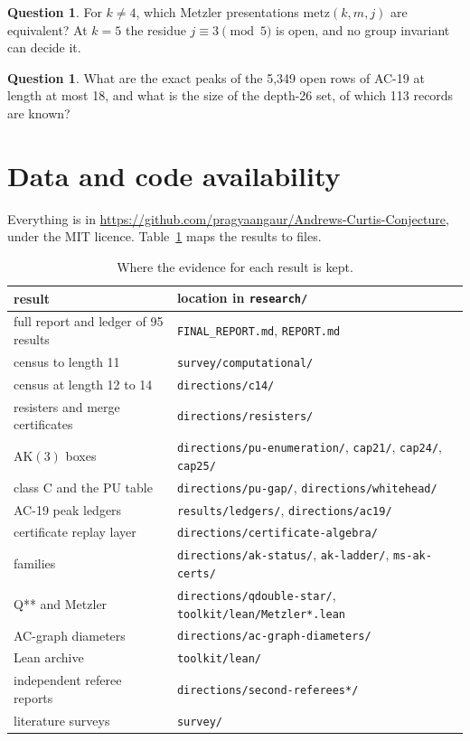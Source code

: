 \documentclass[11pt,a4paper]{article}
\theoremstyle{definition}
\newtheorem{question}[theorem]{Question}
\newcommand{\AK}{\mathrm{AK}}
\newcommand{\repo}{\url{https://github.com/pragyaangaur/Andrews-Curtis-Conjecture}}
\begin{document}
\begin{question}
For $k\ne4$, which Metzler presentations $\mathrm{metz}(k,m,j)$ are equivalent? At $k=5$ the residue $j\equiv3\pmod5$ is open, and no group invariant can decide it.
\end{question}

\begin{question}
What are the exact peaks of the 5,349 open rows of AC-19 at length at most 18, and what is the size of the depth-26 set, of which 113 records are known?
\end{question}

\section{Data and code availability}

Everything is in \repo, under the MIT licence. Table~\ref{tab:files} maps the results to files.

\begin{table}[h]
\centering
\small
\begin{tabular}{ll}
\toprule
result & location in \texttt{research/} \\
\midrule
full report and ledger of 95 results & \texttt{FINAL\_REPORT.md}, \texttt{REPORT.md} \\
census to length 11 & \texttt{survey/computational/} \\
census at length 12 to 14 & \texttt{directions/c14/} \\
resisters and merge certificates & \texttt{directions/resisters/} \\
$\AK(3)$ boxes & \texttt{directions/pu-enumeration/}, \texttt{cap21/}, \texttt{cap24/}, \texttt{cap25/} \\
class C and the PU table & \texttt{directions/pu-gap/}, \texttt{directions/whitehead/} \\
AC-19 peak ledgers & \texttt{results/ledgers/}, \texttt{directions/ac19/} \\
certificate replay layer & \texttt{directions/certificate-algebra/} \\
families & \texttt{directions/ak-status/}, \texttt{ak-ladder/}, \texttt{ms-ak-certs/} \\
Q** and Metzler & \texttt{directions/qdouble-star/}, \texttt{toolkit/lean/Metzler*.lean} \\
AC-graph diameters & \texttt{directions/ac-graph-diameters/} \\
Lean archive & \texttt{toolkit/lean/} \\
independent referee reports & \texttt{directions/second-referees*/} \\
literature surveys & \texttt{survey/} \\
\bottomrule
\end{tabular}
\caption{Where the evidence for each result is kept.}
\label{tab:files}
\end{table}
\end{document}
